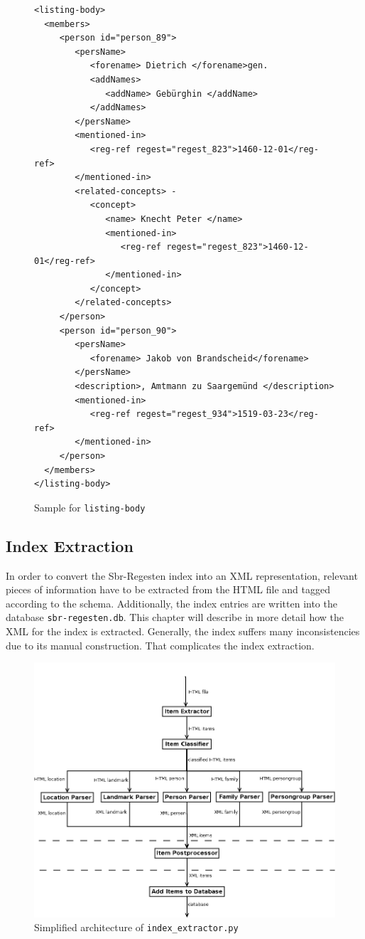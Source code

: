 \begin{figure}[H]
\centering
\begin{verbatim}
<listing-body>
  <members>
     <person id="person_89">
        <persName>
           <forename> Dietrich </forename>gen.
           <addNames>
              <addName> Gebürghin </addName>
           </addNames>
        </persName>
        <mentioned-in>
           <reg-ref regest="regest_823">1460-12-01</reg-ref>
        </mentioned-in>
        <related-concepts> -
           <concept>
              <name> Knecht Peter </name>
              <mentioned-in>
                 <reg-ref regest="regest_823">1460-12-01</reg-ref>
              </mentioned-in>
           </concept>
        </related-concepts>
     </person>
     <person id="person_90">
        <persName>
           <forename> Jakob von Brandscheid</forename>
        </persName>
        <description>, Amtmann zu Saargemünd </description>
        <mentioned-in>
           <reg-ref regest="regest_934">1519-03-23</reg-ref>
        </mentioned-in>
     </person>
  </members>
</listing-body>
\end{verbatim}
\caption{Sample for \texttt{listing-body}}
\label{fig:listing-body-xml}
\end{figure}


\subsection{Index Extraction}
In order to convert the Sbr-Regesten index into an XML representation, relevant pieces of information have to be extracted from the HTML file and tagged according to the schema. Additionally, the index entries are written into the database \texttt{sbr-regesten.db}. This chapter will describe in more detail how the XML for the index is extracted. Generally, the index suffers many inconsistencies due to its manual construction. That complicates the index extraction.


\begin{figure}[h]
  \centering
  \includegraphics[scale=0.5]{img/index-extractor}
  \caption{Simplified architecture of \texttt{index\_extractor.py}}
  \label{fig:index-extractor}
\end{figure}


